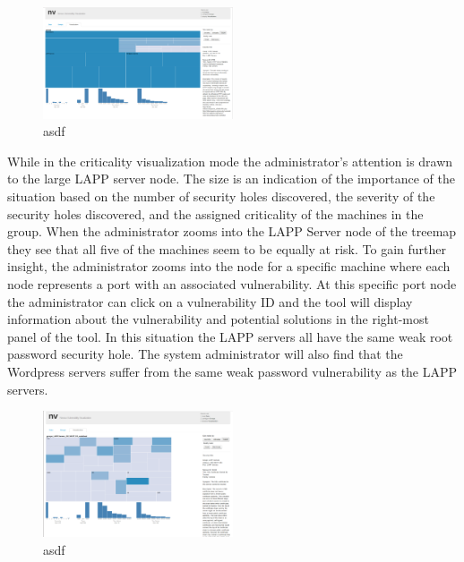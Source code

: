 \documentclass{acm_proc_article-sp}
\begin{document}
\begin{figure}
  \centering
  \includegraphics[width=0.5\textwidth]{../screenshots/final/SimGroupSingle}
  \caption{asdf}
\end{figure}

While in the criticality visualization mode the administrator's attention is
drawn to the large LAPP server node. The size is an indication of the
importance of the situation based on the number of security holes discovered,
the severity of the security holes discovered, and the assigned criticality of
the machines in the group. When the administrator zooms into the LAPP Server
node of the treemap they see that all five of the machines seem to be equally
at risk. To gain further insight, the administrator zooms into the node for a
specific machine where each node represents a port with an associated
vulnerability. At this specific port node the administrator can click on a
vulnerability ID and the tool will display information about the vulnerability
and potential solutions in the right-most panel of the tool. In this situation the LAPP servers all have the same
weak root password security hole. The system administrator will also find that
the Wordpress servers suffer from the same weak password vulnerability as the
LAPP servers.

\begin{figure}
  \centering
  \includegraphics[width=0.5\textwidth]{../screenshots/final/LappServerSimPort}
  \caption{asdf}
\end{figure}
\end{document}
